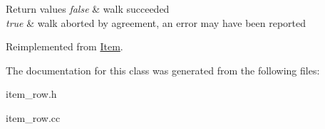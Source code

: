 \begin{DoxyRetVals}{Return values}
{\em false} & walk succeeded \\
\hline
{\em true} & walk aborted by agreement, an error may have been reported \\
\hline
\end{DoxyRetVals}


Reimplemented from \mbox{\hyperlink{classItem_ab7d2529511c14a77e59a1b1bbabc95d7}{Item}}.



The documentation for this class was generated from the following files\+:\begin{DoxyCompactItemize}
\item 
item\+\_\+row.\+h\item 
item\+\_\+row.\+cc\end{DoxyCompactItemize}
